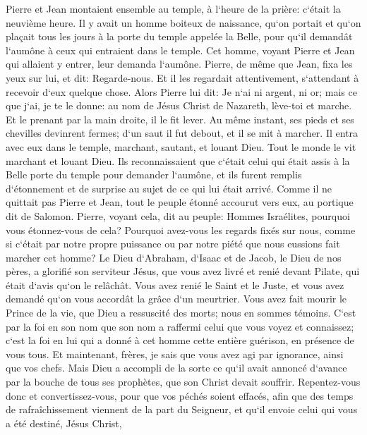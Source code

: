 \verse Pierre et Jean montaient ensemble au temple, à l`heure de la prière: c`était la neuvième heure. 
\verse Il y avait un homme boiteux de naissance, qu`on portait et qu`on plaçait tous les jours à la porte du temple appelée la Belle, pour qu`il demandât l`aumône à ceux qui entraient dans le temple. 
\verse Cet homme, voyant Pierre et Jean qui allaient y entrer, leur demanda l`aumône. 
\verse Pierre, de même que Jean, fixa les yeux sur lui, et dit: Regarde-nous. 
\verse Et il les regardait attentivement, s`attendant à recevoir d`eux quelque chose. 
\verse Alors Pierre lui dit: Je n`ai ni argent, ni or; mais ce que j`ai, je te le donne: au nom de Jésus Christ de Nazareth, lève-toi et marche. 
\verse Et le prenant par la main droite, il le fit lever. Au même instant, ses pieds et ses chevilles devinrent fermes; 
\verse d`un saut il fut debout, et il se mit à marcher. Il entra avec eux dans le temple, marchant, sautant, et louant Dieu. 
\verse Tout le monde le vit marchant et louant Dieu. 
\verse Ils reconnaissaient que c`était celui qui était assis à la Belle porte du temple pour demander l`aumône, et ils furent remplis d`étonnement et de surprise au sujet de ce qui lui était arrivé. 
\verse Comme il ne quittait pas Pierre et Jean, tout le peuple étonné accourut vers eux, au portique dit de Salomon. 
\verse Pierre, voyant cela, dit au peuple: Hommes Israélites, pourquoi vous étonnez-vous de cela? Pourquoi avez-vous les regards fixés sur nous, comme si c`était par notre propre puissance ou par notre piété que nous eussions fait marcher cet homme? 
\verse Le Dieu d`Abraham, d`Isaac et de Jacob, le Dieu de nos pères, a glorifié son serviteur Jésus, que vous avez livré et renié devant Pilate, qui était d`avis qu`on le relâchât. 
\verse Vous avez renié le Saint et le Juste, et vous avez demandé qu`on vous accordât la grâce d`un meurtrier. 
\verse Vous avez fait mourir le Prince de la vie, que Dieu a ressuscité des morts; nous en sommes témoins. 
\verse C`est par la foi en son nom que son nom a raffermi celui que vous voyez et connaissez; c`est la foi en lui qui a donné à cet homme cette entière guérison, en présence de vous tous. 
\verse Et maintenant, frères, je sais que vous avez agi par ignorance, ainsi que vos chefs. 
\verse Mais Dieu a accompli de la sorte ce qu`il avait annoncé d`avance par la bouche de tous ses prophètes, que son Christ devait souffrir. 
\verse Repentez-vous donc et convertissez-vous, pour que vos péchés soient effacés, 
\verse afin que des temps de rafraîchissement viennent de la part du Seigneur, et qu`il envoie celui qui vous a été destiné, Jésus Christ, 
